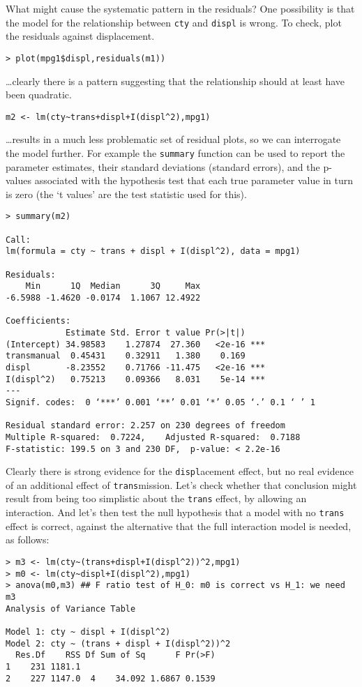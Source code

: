 \documentclass[10pt] {article}
\newcommand{\eps}[3]
{{\begin{center}
 \rotatebox{#1}{\scalebox{#2}{\texttt{[image: \#3]}}}
 \end{center}}
}
\theoremstyle{definition}
\begin{document}
What might cause the systematic pattern in the residuals? One possibility is that the model for the relationship between {\tt cty} and {\tt displ} is wrong. To check, plot the residuals against displacement.
\begin{lstlisting}
> plot(mpg1$displ,residuals(m1))
\end{lstlisting}
\eps{-90}{.5}{mpg-resid1.eps}  
\ldots clearly there is a pattern suggesting that the relationship should at least have been quadratic.
\begin{lstlisting}
m2 <- lm(cty~trans+displ+I(displ^2),mpg1)
\end{lstlisting}
\ldots results in a much less problematic set of residual plots, so we can interrogate the model further. For example the {\tt summary} function can be used to report the parameter estimates, their standard deviations (standard errors), and the p-values associated with the hypothesis test that each true parameter value in turn is zero (the `t values' are the test statistic used for this).  
{\small
\begin{verbatim}
> summary(m2)

Call:
lm(formula = cty ~ trans + displ + I(displ^2), data = mpg1)

Residuals:
    Min      1Q  Median      3Q     Max 
-6.5988 -1.4620 -0.0174  1.1067 12.4922 

Coefficients:
            Estimate Std. Error t value Pr(>|t|)    
(Intercept) 34.98583    1.27874  27.360   <2e-16 ***
transmanual  0.45431    0.32911   1.380    0.169    
displ       -8.23552    0.71766 -11.475   <2e-16 ***
I(displ^2)   0.75213    0.09366   8.031    5e-14 ***
---
Signif. codes:  0 ‘***’ 0.001 ‘**’ 0.01 ‘*’ 0.05 ‘.’ 0.1 ‘ ’ 1

Residual standard error: 2.257 on 230 degrees of freedom
Multiple R-squared:  0.7224,	Adjusted R-squared:  0.7188 
F-statistic: 199.5 on 3 and 230 DF,  p-value: < 2.2e-16
\end{verbatim}}
Clearly there is strong evidence for the {\tt displ}acement effect, but no real evidence of an additional effect of {\tt trans}mission. Let's check whether that conclusion might result from being too simplistic about the {\tt trans} effect, by allowing an interaction. And let's then test the null hypothesis that a model with no {\tt trans} effect is correct, against the alternative that the full interaction model is needed, as follows:
{\small
\begin{verbatim}
> m3 <- lm(cty~(trans+displ+I(displ^2))^2,mpg1)
> m0 <- lm(cty~displ+I(displ^2),mpg1)
> anova(m0,m3) ## F ratio test of H_0: m0 is correct vs H_1: we need m3
Analysis of Variance Table

Model 1: cty ~ displ + I(displ^2)
Model 2: cty ~ (trans + displ + I(displ^2))^2
  Res.Df    RSS Df Sum of Sq      F Pr(>F)
1    231 1181.1                           
2    227 1147.0  4    34.092 1.6867 0.1539
\end{verbatim}}
\end{document}
